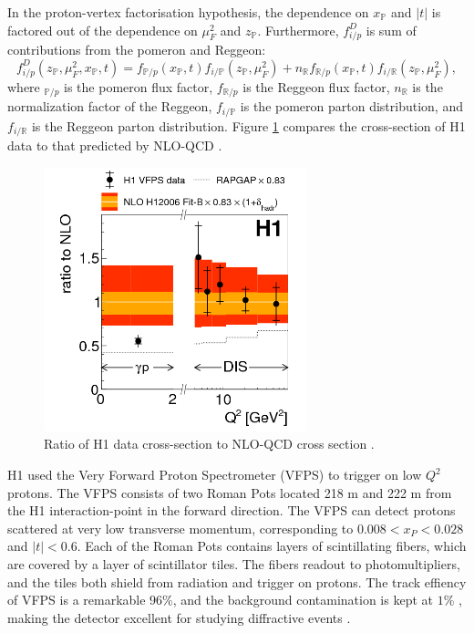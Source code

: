 In the proton-vertex factorisation hypothesis, the dependence on $x_{\mathbb{P}}$ and $|t|$ is factored out of the dependence on $\mu^2_F$ and $z_{\mathbb{P}}$. Furthermore, $f^D_{i/p}$ is sum of contributions from the pomeron and Reggeon:
\begin{equation}
f^D_{i/p}(z_{\mathbb{P}},\mu^2_F,x_{\mathbb{P}},t) = f_{\mathbb{P}/p}(x_{\mathbb{P}},t)f_{i/\mathbb{P}}(z_{\mathbb{P}},\mu^2_F) + n_\mathbb{R}f_{\mathbb{R}/p}(x_{\mathbb{P}},t)f_{i/\mathbb{R}}(z_{\mathbb{P}},
\mu^2_F) ,
\end{equation}
where $_{\mathbb{P}/p}$ is the pomeron flux factor, $f_{\mathbb{R}/p}$ is the Reggeon flux factor, $n_\mathbb{R}$ is the normalization factor of the Reggeon, $f_{i/\mathbb{P}}$ is the pomeron parton distribution, and $f_{i/\mathbb{R}}$ is the Reggeon parton distribution. Figure \ref{fig:h1Ratio} compares the cross-section of H1 data to that predicted by NLO-QCD \cite{Andreev:2015cwa}.

\begin{figure}[h!]
\begin{centering}
\includegraphics[width=3in]{Chapter1/importfigs/fig8_h1_2015.png}
\par\end{centering}
\caption{Ratio of H1 data cross-section to NLO-QCD cross section \cite{Andreev:2015cwa}. \label{fig:h1Ratio}}
\end{figure}

H1 used the Very Forward Proton Spectrometer (VFPS) to trigger on low $Q^2$ protons. The VFPS consists of two Roman Pots located 218 m and 222 m from the H1 interaction-point in the forward direction. The VFPS can detect protons scattered at very low transverse momentum, corresponding to $0.008 < x_{P} < 0.028$ and $|t|<0.6$. Each of the Roman Pots contains layers of scintillating fibers, which are covered by a layer of scintillator tiles. The fibers readout to photomultipliers, and the tiles both shield from radiation and trigger on protons. The track effiency of VFPS is a remarkable $96 \%$, and the background contamination is kept at $1 \%$ , making the detector excellent for studying diffractive events \cite{Andreev:2015cwa}.

